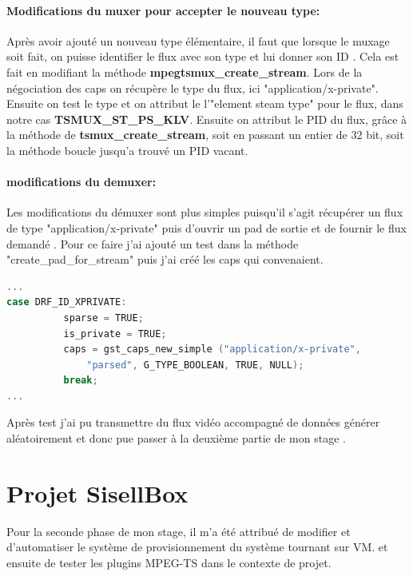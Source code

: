 \paragraph{Modifications du muxer pour accepter le nouveau type:} Après avoir ajouté un nouveau type élémentaire, il faut que lorsque le muxage soit fait, on puisse identifier le flux avec son type et lui donner son ID . Cela est fait en modifiant la méthode \textbf{mpegtsmux\_create\_stream}. Lors de la négociation des caps on récupère le type du flux, ici "application/x-private". Ensuite on test le type et on attribut le l'"element steam type" pour le flux, dans notre cas \textbf{TSMUX\_ST\_PS\_KLV}. Ensuite on attribut le PID du flux, grâce à la méthode de \textbf{tsmux\_create\_stream}, soit en passant un entier de 32 bit, soit la méthode
boucle jusqu'a trouvé un PID vacant.
\paragraph{modifications du demuxer:}  Les modifications du démuxer sont plus simples puisqu'il s'agit récupérer un flux de type "application/x-private" puis d'ouvrir un pad de sortie et de fournir le flux demandé . Pour ce faire j'ai ajouté un test dans la méthode "create\_pad\_for\_stream" puis j'ai créé les caps qui convenaient.
\begin{lstlisting}[language=C, caption=création de caps pour le flux sortant,label=demux_c]
...
case DRF_ID_XPRIVATE:
          sparse = TRUE;
          is_private = TRUE;
          caps = gst_caps_new_simple ("application/x-private",
              "parsed", G_TYPE_BOOLEAN, TRUE, NULL);
          break;
...
\end{lstlisting}

Après test j'ai pu transmettre du flux vidéo accompagné de données générer aléatoirement et donc pue passer à la deuxième partie de mon stage .

\section{Projet SisellBox}

Pour la seconde phase de mon stage, il m'a été attribué de modifier et d'automatiser le système de provisionnement du système tournant sur VM. et ensuite de tester les plugins MPEG-TS dans le contexte de projet.

